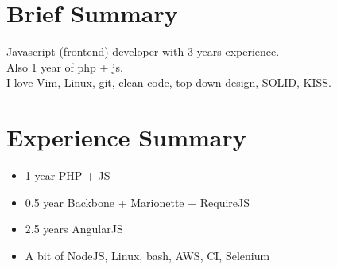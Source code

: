 \documentclass[a4paper, 14pt]{article}
\begin{document}
\begin{center}
	\textsc{\Huge{}}
\end{center}


\section{Brief Summary}
    Javascript (frontend) developer with 3 years experience.  \\
    Also 1 year of php + js. \\
    I love Vim, Linux, git, clean code, top-down design, SOLID, KISS.

\section{Experience Summary}
  \begin{itemize}
    \item 1 year PHP + JS \\ 
    \item 0.5 year Backbone + Marionette + RequireJS \\ 
    \item 2.5 years AngularJS \\ 
    \item A bit of NodeJS, Linux, bash, AWS, CI, Selenium
  \end{itemize}
\end{document}
